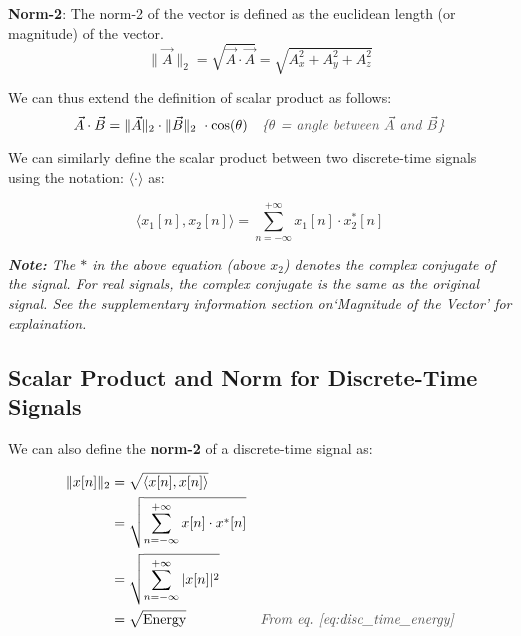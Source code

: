 \documentclass[letterpaper,12pt]{article}
\newcommand{\annot}[1]{\textcolor{darkgray}{\textit{#1}}}
\begin{document}
\textbf{Norm-2}: The norm-2 of the vector is defined as the euclidean length (or magnitude) of the vector.
\[\| \Vec{A} \|_2 = \sqrt{\Vec{A} \cdot \Vec{A}} = \sqrt{A_{x}^2 + A_{y}^2 + A_{z}^2}\]

We can thus extend the definition of scalar product as follows:
\[\Vec{A}\cdot\Vec{B} = \| \Vec{A} \|_2 \cdot \| \Vec{B} \|_2\ \cdot \cos(\theta) \quad \text{\annot{\{$\theta$ = angle between $\Vec{A}$ and $\Vec{B}$\}}}\]

We can similarly define the scalar product between two discrete-time signals
using the notation: $\langle \cdot \rangle$ as:

\begin{equation}
    \label{eq:scalar_product_discrete_time}
    \langle x_{1}[n], x_{2}[n] \rangle = \sum_{n=-\infty}^{+\infty} x_{1}[n] \cdot x_{2}^{*}[n]
\end{equation}

\textit{\textbf{Note:} The $*$ in the above equation (above $x_{2}$) denotes the complex conjugate of the signal. For real signals, the complex conjugate is the same as the original signal. See the supplementary information section on`Magnitude of the Vector' for explaination.}

\vspace{0.5cm}

\subsection{Scalar Product and Norm for Discrete-Time Signals}

We can also define the \textbf{norm-2} of a discrete-time signal as:

\begin{equation}
    \begin{aligned}
        \| x[n] \|_2 & = \sqrt{\langle x[n], x[n] \rangle}                                                                         \\
                     & = \sqrt{\sum_{n=-\infty}^{+\infty} x[n] \cdot x^{*}[n]}                                                     \\
                     & = \sqrt{\sum_{n=-\infty}^{+\infty}|x[n]|^{2}}                                                               \\
                     & = \sqrt{\text{Energy}}                                  & \annot{\text{From eq.~\ref{eq:disc_time_energy}}}
    \end{aligned}
    \label{eq:norm_discrete_time}
\end{equation}
\end{document}
